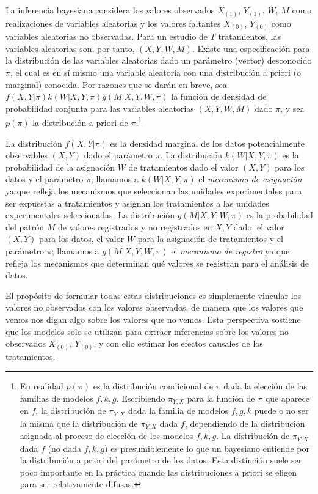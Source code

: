 \documentclass[12pt,a4paper]{article}
\begin{document}
La inferencia bayesiana considera los valores observados $\tilde{X}_{(1)}$, $\tilde{Y}_{(1)}$, $\tilde{W}$, $\tilde{M}$ como realizaciones de variables aleatorias y los valores faltantes $X_{(0)}$, $Y_{(0)}$ como variables aleatorias no observadas. Para un estudio de $T$ tratamientos, las variables aleatorias son, por tanto, $(X, Y, W, M)$. Existe una especificación para la distribución de las variables aleatorias dado un parámetro (vector) desconocido $\pi$, el cual es en sí mismo una variable aleatoria con una distribución a priori (o marginal) conocida. Por razones que se darán en breve, sea $f(X,Y|\pi)k(W|X,Y,\pi)g(M|X,Y,W,\pi)$ la función de densidad de probabilidad conjunta para las variables aleatorias $(X, Y, W, M)$ dado $\pi$, y sea $p(\pi)$ la distribución a priori de $\pi$.\footnote{En realidad $p(\pi)$ es la distribución condicional de $\pi$ dada la elección de las familias de modelos $f, k, g$. Escribiendo $\pi_{Y,X}$ para la función de $\pi$ que aparece en $f$, la distribución de $\pi_{Y,X}$ dada la familia de modelos $f, g, k$ puede o no ser la misma que la distribución de $\pi_{Y,X}$ dada $f$, dependiendo de la distribución asignada al proceso de elección de los modelos $f, k, g$. La distribución de $\pi_{Y,X}$ dada $f$ (no dada $f, k, g$) es presumiblemente lo que un bayesiano entiende por la distribución a priori del parámetro de los datos. Esta distinción suele ser poco importante en la práctica cuando las distribuciones a priori se eligen para ser relativamente difusas.} 

La distribución $f(X,Y|\pi)$ es la densidad marginal de los datos potencialmente observables $(X, Y)$ dado el parámetro $\pi$. La distribución $k(W|X,Y,\pi)$ es la probabilidad de la asignación $W$ de tratamientos dado el valor $(X, Y)$ para los datos y el parámetro $\pi$; llamamos a $k(W|X,Y,\pi)$ el \textit{mecanismo de asignación} ya que refleja los mecanismos que seleccionan las unidades experimentales para ser expuestas a tratamientos y asignan los tratamientos a las unidades experimentales seleccionadas. La distribución $g(M|X,Y,W,\pi)$ es la probabilidad del patrón $M$ de valores registrados y no registrados en $X, Y$ dado: el valor $(X, Y)$ para los datos, el valor $W$ para la asignación de tratamientos y el parámetro $\pi$; llamamos a $g(M|X,Y,W,\pi)$ el \textit{mecanismo de registro} ya que refleja los mecanismos que determinan qué valores se registran para el análisis de datos.

El propósito de formular todas estas distribuciones es simplemente vincular los valores no observados con los valores observados, de manera que los valores que vemos nos digan algo sobre los valores que no vemos. Esta perspectiva sostiene que los modelos solo se utilizan para extraer inferencias sobre los valores no observados $X_{(0)}$, $Y_{(0)}$, y con ello estimar los efectos causales de los tratamientos.
\end{document}
